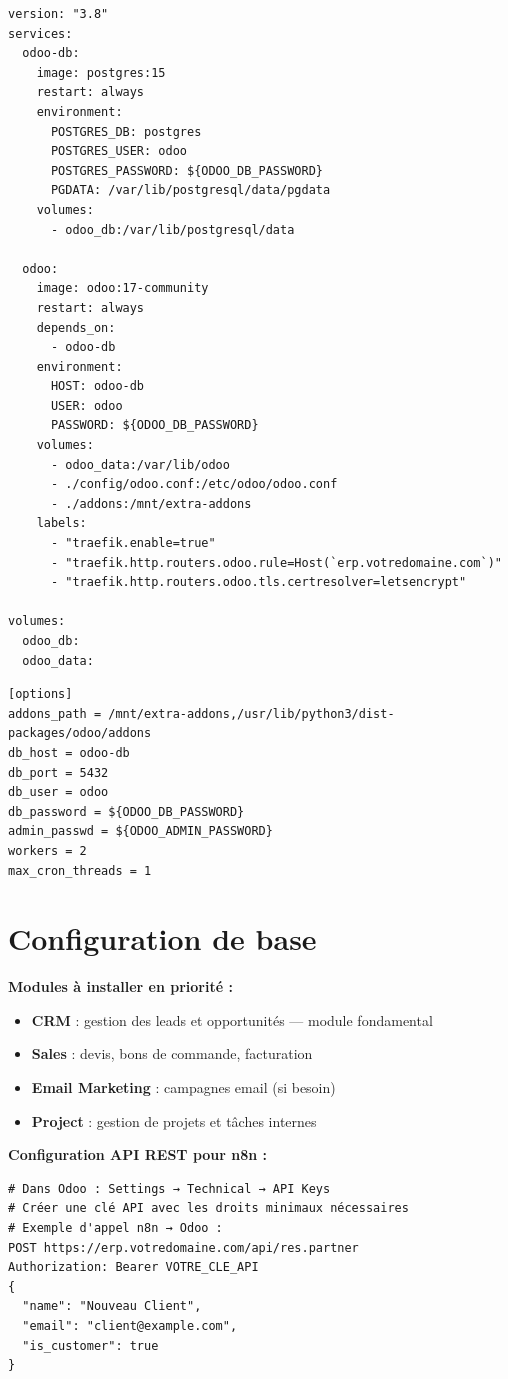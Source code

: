 \documentclass[11pt, a4paper]{article}
\begin{document}
\begin{lstlisting}[style=yamlstyle, caption={docker-compose.yml — Odoo Community + PostgreSQL}]
version: "3.8"
services:
  odoo-db:
    image: postgres:15
    restart: always
    environment:
      POSTGRES_DB: postgres
      POSTGRES_USER: odoo
      POSTGRES_PASSWORD: ${ODOO_DB_PASSWORD}
      PGDATA: /var/lib/postgresql/data/pgdata
    volumes:
      - odoo_db:/var/lib/postgresql/data

  odoo:
    image: odoo:17-community
    restart: always
    depends_on:
      - odoo-db
    environment:
      HOST: odoo-db
      USER: odoo
      PASSWORD: ${ODOO_DB_PASSWORD}
    volumes:
      - odoo_data:/var/lib/odoo
      - ./config/odoo.conf:/etc/odoo/odoo.conf
      - ./addons:/mnt/extra-addons
    labels:
      - "traefik.enable=true"
      - "traefik.http.routers.odoo.rule=Host(`erp.votredomaine.com`)"
      - "traefik.http.routers.odoo.tls.certresolver=letsencrypt"

volumes:
  odoo_db:
  odoo_data:
\end{lstlisting}

\begin{lstlisting}[style=yamlstyle, caption={config/odoo.conf}]
[options]
addons_path = /mnt/extra-addons,/usr/lib/python3/dist-packages/odoo/addons
db_host = odoo-db
db_port = 5432
db_user = odoo
db_password = ${ODOO_DB_PASSWORD}
admin_passwd = ${ODOO_ADMIN_PASSWORD}
workers = 2
max_cron_threads = 1
\end{lstlisting}

\section{Configuration de base}

\textbf{Modules à installer en priorité :}
\begin{itemize}
  \item \textbf{CRM} : gestion des leads et opportunités — module fondamental
  \item \textbf{Sales} : devis, bons de commande, facturation
  \item \textbf{Email Marketing} : campagnes email (si besoin)
  \item \textbf{Project} : gestion de projets et tâches internes
\end{itemize}

\textbf{Configuration API REST pour n8n :}
\begin{lstlisting}[style=terminal]
# Dans Odoo : Settings → Technical → API Keys
# Créer une clé API avec les droits minimaux nécessaires
# Exemple d'appel n8n → Odoo :
POST https://erp.votredomaine.com/api/res.partner
Authorization: Bearer VOTRE_CLE_API
{
  "name": "Nouveau Client",
  "email": "client@example.com",
  "is_customer": true
}
\end{lstlisting}
\end{document}
